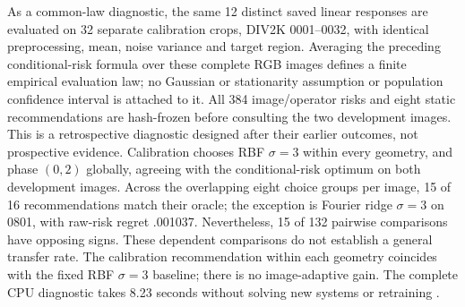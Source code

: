 As a common-law diagnostic, the same 12 distinct saved linear responses
are evaluated on 32 separate calibration crops, DIV2K 0001--0032, with
identical preprocessing, mean, noise variance and target region. Averaging
the preceding conditional-risk formula over these complete RGB images
defines a finite empirical evaluation law; no Gaussian or stationarity
assumption or population confidence interval is attached to it. All 384
image/operator risks and eight static recommendations are hash-frozen
before consulting the two development images. This is a retrospective
diagnostic designed after their earlier outcomes, not prospective evidence.
Calibration chooses RBF $\sigma=3$ within every geometry, and phase $(0,2)$
globally, agreeing with the conditional-risk optimum on both development
images. Across the overlapping eight choice groups per image, 15 of 16
recommendations match their oracle; the exception is Fourier ridge
$\sigma=3$ on 0801, with raw-risk regret .001037. Nevertheless, 15 of 132
pairwise comparisons have opposing signs. These dependent comparisons
do not establish a general transfer rate. The calibration recommendation
within each geometry coincides with the fixed RBF $\sigma=3$ baseline;
there is no image-adaptive gain. The complete CPU diagnostic takes 8.23
seconds without solving new systems or retraining .
